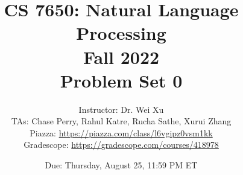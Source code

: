 \documentclass[11pt, letterpaper]{article}
\begin{document}
\title{CS 7650: Natural Language Processing \\ Fall 2022 \\ Problem Set 0}
\author{Instructor: Dr. Wei Xu \\ TAs: Chase Perry, Rahul Katre, Rucha Sathe, Xurui Zhang
\\Piazza: \url{https://piazza.com/class/l6vgipz0vsm1kk}
\\Gradescope: \url{https://gradescope.com/courses/418978}}
\date{Due: Thursday, August 25, 11:59 PM ET}
\maketitle

\iftoggle{solutions}{
    \paragraph{}
    {\large
    \textbf{\textcolor{red}{WARNING: THIS FILE HAS SOLUTIONS}}}
    \paragraph{}
}
{}
\end{document}
